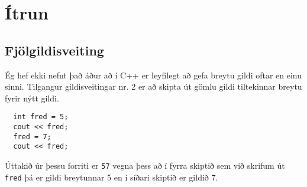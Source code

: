 





\chapter{Ítrun}

\section{Fjölgildisveiting}

Ég hef ekki nefnt það áður að í C++ er leyfilegt að gefa breytu gildi oftar en einu sinni.
Tilgangur gildisveitingar nr. 2 er að skipta út gömlu gildi tiltekinnar breytu fyrir nýtt gildi.

\begin{verbatim}
  int fred = 5;
  cout << fred;
  fred = 7;
  cout << fred;
\end{verbatim}
%
Úttakið úr þessu forriti er {\tt 57} vegna þess að í fyrra skiptið sem við skrifum út {\tt fred}
þá er gildi breytunnar 5 en í síðari skiptið er gildið 7.

